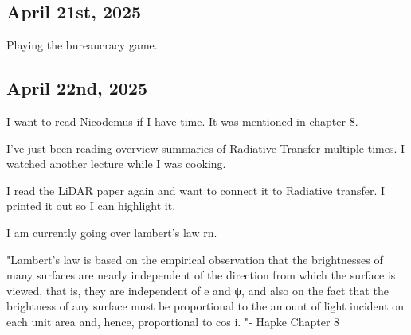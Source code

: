 \documentclass{article}
\begin{document}
\subsection{April 21st, 2025}
Playing the bureaucracy game. 


\subsection{April 22nd, 2025}
I want to read Nicodemus if I have time. It was mentioned in chapter 8. 

I've just been reading overview summaries of Radiative Transfer multiple times. I watched another lecture while I was cooking. 

I read the LiDAR paper again and want to connect it to Radiative transfer. I printed it out so I can highlight it. 

I am currently going over lambert's law rn. 

"Lambert’s law is based on the empirical observation that the brightnesses of many 
surfaces are nearly independent of the direction from which the surface is viewed, 
that is, they are independent of  e  and  ψ, and also on the fact that the brightness 
of any surface must be proportional to the amount of light incident on each unit 
area and, hence, proportional to cos  i. "- Hapke Chapter 8


















\end{document}
